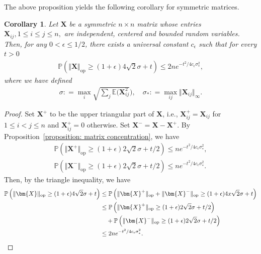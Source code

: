 \documentclass[11pt]{article}
\newcommand{\op}{\mathrm{op}}
\newcommand{\bbE}{\mathbb{E}}
\newcommand{\bbP}{\mathbb{P}}
\newcommand{\bX}{\bm{X}}
\newcommand{\<}{\langle}
\renewcommand{\>}{\rangle}
\theoremstyle{plain}
\newtheorem{corollary}{Corollary}
\theoremstyle{definition}
\theoremstyle{remark}
\begin{document}
{The above proposition yields the following corollary for symmetric matrices.

\begin{corollary}
\label{corollary: symmetric matrix concentration}
    Let $\bX$ be a symmetric $n \times n$ matrix whose entries $\bX_{i j}, 1 \le i \le j \le n,$ are independent, centered and bounded random variables. Then, for any $0 < \epsilon \le 1/2$, there exists a universal constant $c_\epsilon$ such that for every $t > 0$
    \begin{align*}
        \bbP \left ( \Vert \bX \Vert_{\op} \ge (1 + \epsilon) 4 \sqrt{2} \sigma + t \right ) \le 2n e^{-t^2 / 4c_\epsilon \sigma_*^2},
    \end{align*}
    where we have defined
    \begin{align*}
        \sigma : = \max_i \sqrt{\sum_j \bbE (\bX_{i j}^2}), \quad \sigma_* : = \max_{i j}  \Vert \bX_{i j} \Vert_{\infty}.
    \end{align*}
\end{corollary}

\begin{proof}
    Set $\bX^+$ to be the upper triangular part of $\bX$, i.e., $\bX^+_{i j} = \bX_{i j}$ for $1 \le i < j \le n$ and $\bX^+_{i j} = 0$ otherwise. Set $\bX^- = \bX - \bX^+$. By Proposition~\ref{proposition: matrix concentration}, we have
    \begin{align*}
        \bbP \left ( \Vert \bX^+ \Vert_{\op} \ge (1 + \epsilon) 2 \sqrt{2} \sigma + t/2 \right ) \le n e^{-t^2 / 4 c_\epsilon \sigma_*^2}, \\
        \bbP \left ( \Vert \bX^- \Vert_{\op} \ge (1 + \epsilon) 2 \sqrt{2} \sigma + t/2 \right ) \le n e^{-t^2 / 4 c_\epsilon \sigma_*^2}.
    \end{align*}
    Then, by the triangle inequality, we have
    \begin{align*}
        \bbP \left ( \Vert \bX \Vert_{\op} \ge  (1 + \epsilon) 4 \sqrt{2} \sigma + t \right ) & \le \bbP \left ( \Vert \bX^+ \Vert_{\op} + \Vert \bX^- \Vert_{\op} \ge (1 + \epsilon) 4x \sqrt{2} \sigma + t \right ) \\
        & \le \bbP \left ( \Vert \bX^+ \Vert_{\op} \ge (1 + \epsilon) 2 \sqrt{2} \sigma + t/2 \right ) \\
        & \quad + \bbP \left ( \Vert \bX^- \Vert_{\op} \ge (1 + \epsilon) 2 \sqrt{2} \sigma + t/2 \right ) \\
        & \le 2 n e^{-t^2 / 4 c_\epsilon \sigma_*^2}.  \qedhere
    \end{align*}
\end{proof}


}
\end{document}
